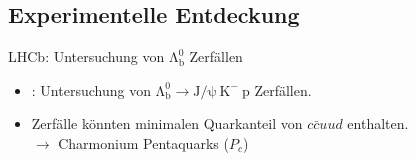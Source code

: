 \documentclass[aspectratio=169]{beamer} %
\begin{document}
      \subsection{Experimentelle Entdeckung}
    \begin{frame}{LHCb: Untersuchung von $\mathrm{\Lambda_b^0}$ Zerfällen} %
        \begin{minipage}{0.31\textwidth}
        \end{minipage}
        \hfill
        \begin{minipage}{0.67\textwidth}
          \begin{itemize}
            \item \textcite{Aaij.2015}: Untersuchung von $\mathrm{\Lambda_b^0} \to \mathrm{J}/\mathrm{\psi}\:\mathrm{K}^-\:\mathrm{p}$ Zerfällen.
            \item<3-> Zerfälle könnten minimalen Quarkanteil von $c\bar{c}uud$ enthalten. \\ $\rightarrow$ Charmonium Pentaquarks ($P_c$)
          \end{itemize}
        \end{minipage}
          \\
\end{frame}
\end{document}
